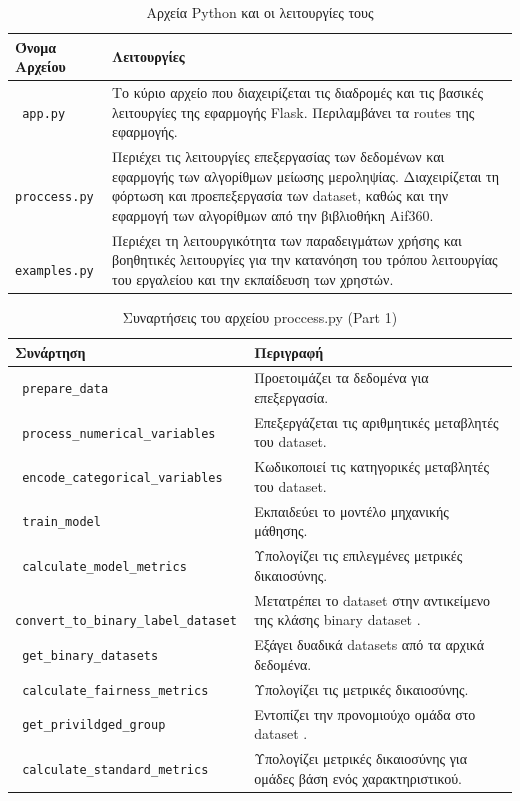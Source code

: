 \documentclass[12pt,twoside]{article}
\newcommand{\en}{\selectlanguage{english}}
\newcommand{\gr}{\selectlanguage{greek}}
\begin{document}
\newpage
\begin{table}[h!]
\centering
\caption{\gr Αρχεία \en Python \gr και οι λειτουργίες τους}
\begin{tabular}{|l|p{10cm}|}
\hline
\textbf{\gr Όνομα Αρχείου} & \textbf{\gr Λειτουργίες} \\ \hline
\texttt{ \en app.py} & \gr Το κύριο αρχείο που διαχειρίζεται τις διαδρομές και τις βασικές λειτουργίες της εφαρμογής \en Flask\gr. Περιλαμβάνει τα \en routes \gr της εφαρμογής. \\ \hline
\texttt{ \en proccess.py} & \gr Περιέχει τις λειτουργίες επεξεργασίας των δεδομένων και εφαρμογής των αλγορίθμων μείωσης μεροληψίας. Διαχειρίζεται τη φόρτωση και προεπεξεργασία των \en dataset\gr, καθώς και την εφαρμογή των αλγορίθμων από την βιβλιοθήκη \en Aif360\gr. \\ \hline
\texttt{ \en examples.py} & \gr Περιέχει τη  λειτουργικότητα των παραδειγμάτων χρήσης και βοηθητικές λειτουργίες για την κατανόηση του τρόπου λειτουργίας του εργαλείου και την εκπαίδευση των χρηστών. \\ \hline
\end{tabular}
\end{table}

\newpage
\begin{table}[H]
\centering
\caption{\gr Συναρτήσεις του αρχείου \en proccess.py (Part 1)}
\begin{tabular}{|p{7cm}|p{7cm}|}
\hline
\textbf{\gr Συνάρτηση} & \textbf{\gr Περιγραφή} \\ \hline
\texttt{ \en prepare\_data} & \gr Προετοιμάζει τα δεδομένα για επεξεργασία. \\ \hline
\texttt{ \en process\_numerical\_variables} & \gr Επεξεργάζεται τις αριθμητικές μεταβλητές του \en dataset\gr. \\ \hline
\texttt{ \en encode\_categorical\_variables} & \gr Κωδικοποιεί τις κατηγορικές μεταβλητές του \en dataset\gr. \\ \hline
\texttt{ \en train\_model} & \gr Εκπαιδεύει το μοντέλο μηχανικής μάθησης. \\ \hline
\texttt{ \en calculate\_model\_metrics} & \gr Υπολογίζει τις επιλεγμένες μετρικές δικαιοσύνης. \\ \hline
\texttt{ \en convert\_to\_binary\_label\_dataset} & \gr Μετατρέπει το \en dataset \gr στην αντικείμενο της κλάσης \en binary dataset . \\ \hline
\texttt{ \en get\_binary\_datasets} & \gr Εξάγει δυαδικά \en datasets \gr από τα αρχικά δεδομένα. \\ \hline
\texttt{ \en calculate\_fairness\_metrics} & \gr Υπολογίζει τις μετρικές δικαιοσύνης. \\ \hline
\texttt{ \en get\_privildged\_group} & \gr Εντοπίζει την προνομιούχο ομάδα στο \en dataset \gr. \\ \hline
\texttt{ \en calculate\_standard\_metrics} & \gr Υπολογίζει μετρικές δικαιοσύνης για ομάδες βάση ενός χαρακτηριστικού. \\ \hline
\end{tabular}
\end{table}
\end{document}
